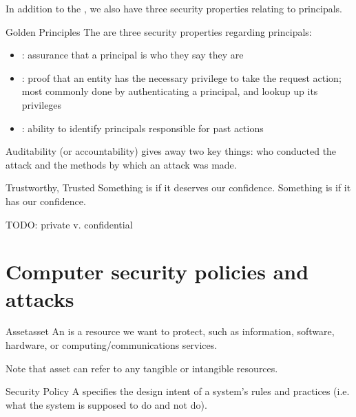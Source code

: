 \documentclass[12pt]{report}
\begin{document}
In addition to the , we also have three security properties relating to principals.
\begin{dfnbox}{Golden Principles}{}
    The  are three security properties regarding principals:

    \begin{itemize}[noitemsep]
        \item {}: assurance that a principal is who they say they are
        \item {}: proof that an entity has the necessary privilege to take the request action; most commonly done by authenticating a principal, and lookup up its privileges
        \item {}: ability to identify principals responsible for past actions
    \end{itemize}

\end{dfnbox}

Auditability (or accountability) gives away two key things: who conducted the attack and the methods by which an attack was made.

\begin{dfnbox}{Trustworthy, Trusted}{}
    Something is  if it deserves our confidence.     Something is  if it has our confidence.

\end{dfnbox}

TODO: private v. confidential

\section{Computer security policies and attacks}

\begin{dfnbox}{Asset}{asset}
    An  is a resource we want to protect, such as information, software, hardware, or computing/communications services.
\end{dfnbox}

Note that asset can refer to any tangible or intangible resources.

\begin{dfnbox}{Security Policy}{}
    A  specifies the design intent of a system's rules and practices (i.e. what the system is supposed to do and not do).
\end{dfnbox}
\end{document}

